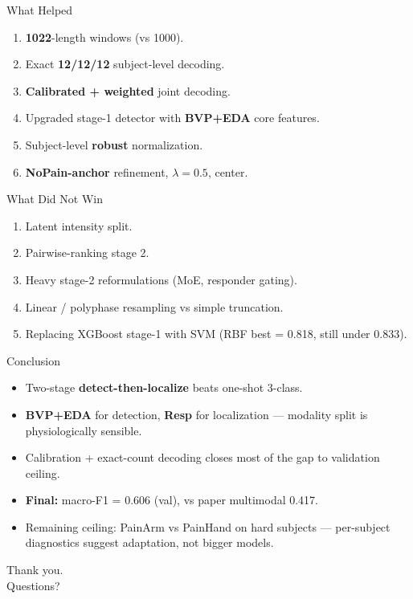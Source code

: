 \documentclass[aspectratio=169,10pt]{beamer}
\begin{document}
\begin{frame}{What Helped}
  \begin{enumerate}
    \item \textbf{1022}-length windows (vs 1000).
    \item Exact \textbf{12/12/12} subject-level decoding.
    \item \textbf{Calibrated + weighted} joint decoding.
    \item Upgraded stage-1 detector with \textbf{BVP+EDA} core features.
    \item Subject-level \textbf{robust} normalization.
    \item \textbf{NoPain-anchor} refinement, $\lambda=0.5$, center.
  \end{enumerate}
\end{frame}

\begin{frame}{What Did Not Win}
  \begin{enumerate}
    \item Latent intensity split.
    \item Pairwise-ranking stage 2.
    \item Heavy stage-2 reformulations (MoE, responder gating).
    \item Linear / polyphase resampling vs simple truncation.
    \item Replacing XGBoost stage-1 with SVM (RBF best = 0.818, still under 0.833).
  \end{enumerate}
\end{frame}

\begin{frame}{Conclusion}
  \begin{itemize}
    \item Two-stage \textbf{detect-then-localize} beats one-shot 3-class.
    \item \textbf{BVP+EDA} for detection, \textbf{Resp} for localization --- modality split is physiologically sensible.
    \item Calibration + exact-count decoding closes most of the gap to validation ceiling.
    \item \textbf{Final:} macro-F1 = 0.606 (val), vs paper multimodal 0.417.
    \item Remaining ceiling: PainArm vs PainHand on hard subjects --- per-subject diagnostics suggest adaptation, not bigger models.
  \end{itemize}
\end{frame}

\begin{frame}
  \centering
  \Large Thank you.\\
  \vspace{6pt}
  \normalsize Questions?
\end{frame}
\end{document}
